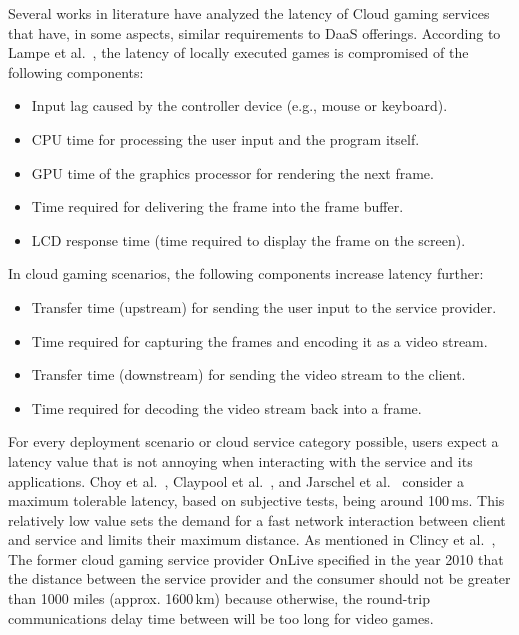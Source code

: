 \documentclass[runningheads]{llncs}
\begin{document}
Several works in literature have analyzed the latency of Cloud gaming services that have, in some aspects, similar requirements to DaaS offerings. According to Lampe et al.~\cite{lampe2014assessing}, the latency of locally executed games is compromised of the following components:

\begin{itemize}
	\item Input lag caused by the controller device (e.g., mouse or keyboard).
	\item CPU time for processing the user input and the program itself.
	\item GPU time of the graphics processor for rendering the next frame.
	\item Time required for delivering the frame into the frame buffer.
	\item LCD response time (time required to display the frame on the screen).
\end{itemize}

In cloud gaming scenarios, the following components increase latency further:

\begin{itemize}
	\item Transfer time (upstream) for sending the user input to the service provider.
	\item Time required for capturing the frames and encoding it as a video stream.
	\item Transfer time (downstream) for sending the video stream to the client.
	\item Time required for decoding the video stream back into a frame.
\end{itemize}

For every deployment scenario or cloud service category possible, users expect a latency value that is not annoying when interacting with the service and its applications. Choy et al.~\cite{ChoyWongSimonRosenberg2012}, Claypool et al.~\cite{claypool2010latency}, and Jarschel et al.~\cite{jarschel2011evaluation} consider a maximum tolerable latency, based on subjective tests, being around 100\,ms. This relatively low value sets the demand for a fast network interaction between client and service and limits their maximum distance. As mentioned in Clincy et al.~\cite{clincy2013subjective}, The former cloud gaming service provider OnLive specified in the year 2010 that the distance between the service provider and the consumer should not be greater than 1000 miles (approx. 1600\,km) because otherwise, the round-trip communications delay time between will be too long for video games.
\end{document}
